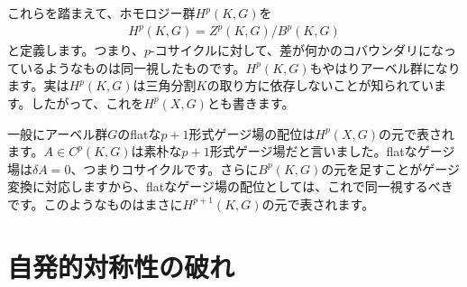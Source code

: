 \documentclass[generalized_symmetry.tex]{subfiles}
\begin{document}
これらを踏まえて、ホモロジー群$H^p(K,G)$を
\begin{align}
    H^p(K,G) = Z^p(K,G)/B^p(K,G)
\end{align}
と定義します。つまり、$p$-コサイクルに対して、差が何かのコバウンダリになっているようなものは同一視したものです。$H^p(K,G)$もやはりアーベル群になります。実は$H^p(K,G)$は三角分割$K$の取り方に依存しないことが知られています。したがって、これを$H^p(X,G)$とも書きます。

一般にアーベル群$G$のflatな$p+1$形式ゲージ場の配位は$H^p(X,G)$の元で表されます。$A \in C^{p}(K,G)$は素朴な$p+1$形式ゲージ場だと言いました。flatなゲージ場は$\delta A=0$、つまりコサイクルです。さらに$B^p(K,G)$の元を足すことがゲージ変換に対応しますから、flatなゲージ場の配位としては、これで同一視するべきです。このようなものはまさに$H^{p+1}(K,G)$の元で表されます。


\section{自発的対称性の破れ}
\end{document}
